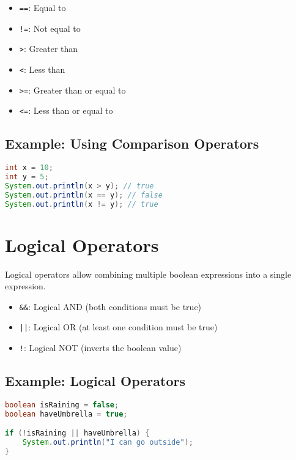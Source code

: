 \documentclass{article}
\begin{document}
\begin{itemize}
    \item \texttt{==}: Equal to
    \item \texttt{!=}: Not equal to
    \item \texttt{>}: Greater than
    \item \texttt{<}: Less than
    \item \texttt{>=}: Greater than or equal to
    \item \texttt{<=}: Less than or equal to
\end{itemize}

\subsection{Example: Using Comparison Operators}
\begin{lstlisting}[language=Java]
int x = 10;
int y = 5;
System.out.println(x > y); // true
System.out.println(x == y); // false
System.out.println(x != y); // true
\end{lstlisting}

\section{Logical Operators}
Logical operators allow combining multiple boolean expressions into a single expression.

\begin{itemize}
    \item \texttt{\&\&}: Logical AND (both conditions must be true)
    \item \texttt{||}: Logical OR (at least one condition must be true)
    \item \texttt{!}: Logical NOT (inverts the boolean value)
\end{itemize}

\subsection{Example: Logical Operators}
\begin{lstlisting}[language=Java]
boolean isRaining = false;
boolean haveUmbrella = true;

if (!isRaining || haveUmbrella) {
    System.out.println("I can go outside");
}
\end{lstlisting}
\end{document}
